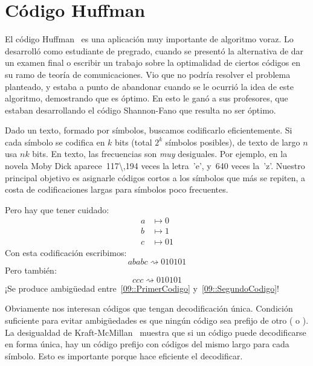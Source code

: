 

\chapter{Código Huffman}
\label{cha:Huffman}

  El código Huffman~%
    \cite{huffman52:_method_const_minim_redun_codes}
  es una aplicación muy importante de algoritmo voraz.
  Lo desarrolló como estudiante de pregrado,
  cuando se presentó la alternativa de dar un examen final
  o escribir un trabajo sobre la optimalidad de ciertos códigos
  en su ramo de teoría de comunicaciones.
  Vio que no podría resolver el problema planteado,
  y estaba a punto de abandonar cuando se le ocurrió la idea de este algoritmo,
  demostrando que es óptimo.
  En esto le ganó a sus profesores,
  que estaban desarrollando el código Shannon-Fano que resulta no ser óptimo.

  Dado un texto,
  formado por símbolos,
  buscamos codificarlo eficientemente.
  Si cada símbolo se codifica en \(k\) bits
  (total \(2^k\) símbolos posibles),
  de texto de largo \(n\) usa \(n k\) bits.
  En texto,
  las frecuencias son \emph{muy} desiguales.
  Por ejemplo,
  en la novela Moby Dick
  aparece~\num{117\,194} veces la letra~'e',
  y~\num{640} veces la~'z'.
  Nuestro principal objetivo es asignarle códigos cortos
  a los símbolos que más se repiten,
  a costa de codificaciones largas para símbolos poco frecuentes.

  Pero hay que tener cuidado:
  \begin{align*}
    a &\mapsto 0 \\
    b &\mapsto 1 \\
    c &\mapsto 01
  \end{align*}
  Con esta codificación escribimos:
  \begin{equation}
    \label{09::PrimerCodigo}
    a b a b c \rightsquigarrow 010101
  \end{equation}
  Pero también:
  \begin{equation}
    \label{09::SegundoCodigo}
    c c c \rightsquigarrow 010101
  \end{equation}
  ¡Se produce ambigüedad entre~\eqref{09::PrimerCodigo}
  y~\eqref{09::SegundoCodigo}!

  Obviamente nos interesan códigos que tengan decodificación única.
  Condición suficiente para evitar ambigüedades es que
  ningún código sea prefijo de otro
  (
   o ).
  La desigualdad de Kraft\nobreakdash-McMillan~%
    \cite{kraft49:_coding, mcmillan56:_two_inequalities}
  muestra que si un código puede decodificarse en forma única,
  hay un código prefijo con códigos del mismo largo para cada símbolo.
  Esto es importante porque hace eficiente el decodificar.

